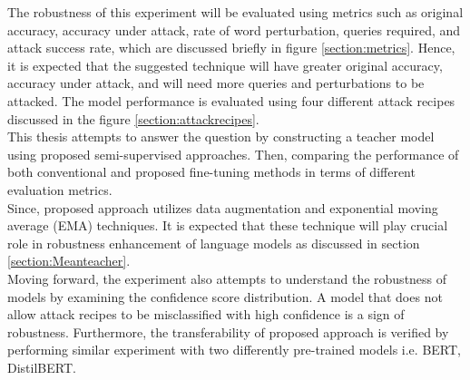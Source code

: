 \documentclass[%
	BCOR=8mm, %
	DIV=12,
	toc=bibliography, %
	toc=listof, %
	oneside, %
	egregdoesnotlikesansseriftitles, %
	]{scrbook}
\begin{document}
The robustness of this experiment will be evaluated using metrics such as original accuracy, accuracy under attack, rate of word perturbation, queries required, and attack success rate, which are discussed briefly in figure \ref{section:metrics}. Hence, it is expected that the suggested technique will have greater original accuracy, accuracy under attack, and will need more queries and perturbations to be attacked. The model performance is evaluated using four different attack recipes discussed in the figure \ref{section:attackrecipes}.\\
This thesis attempts to answer the question by constructing a teacher model using proposed semi-supervised approaches. Then, comparing the performance of both conventional and proposed fine-tuning methods in terms of different evaluation metrics. \\
Since, proposed approach utilizes data augmentation and exponential moving average (EMA) techniques. It is expected that these technique will play crucial role in robustness enhancement of language models as discussed in section \ref{section:Meanteacher}.\\
Moving forward, the experiment also attempts to understand the robustness of models by examining the confidence score distribution. A model that does not allow attack recipes to be misclassified with high confidence is a sign of robustness. Furthermore, the transferability of proposed approach is verified by performing similar experiment with two differently pre-trained models i.e. BERT, DistilBERT.
\end{document}
